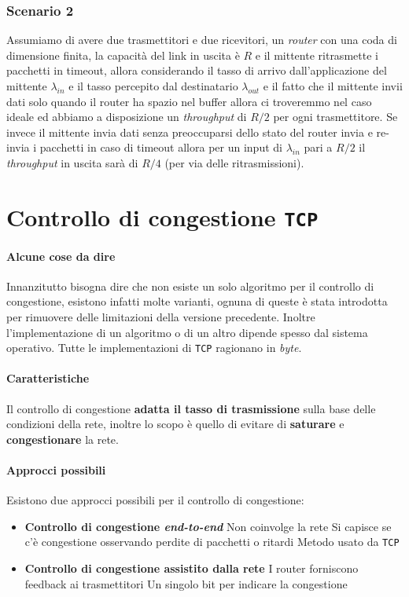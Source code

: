         \subsubsection{Scenario 2}
            Assumiamo di avere due trasmettitori e due ricevitori, un \textit{router} con una coda di dimensione finita, la capacità del link in uscita è $ R $ e il mittente ritrasmette i pacchetti in timeout, allora considerando il tasso di arrivo dall'applicazione del mittente $\lambda_{in}$ e il tasso percepito dal destinatario $\lambda_{out}$ e il fatto che il mittente invii dati solo quando il router ha spazio nel buffer allora ci troveremmo nel caso ideale ed abbiamo a disposizione un \textit{throughput} di $ R/2 $ per ogni trasmettitore. Se invece il mittente invia dati senza preoccuparsi dello stato del router invia e re-invia i pacchetti in caso di timeout allora per un input di $\lambda_{in}$ pari a $ R/2 $ il \textit{throughput} in uscita sarà di $ R/4 $ (per via delle ritrasmissioni).
\section{Controllo di congestione \texttt{TCP}}
    \paragraph{Alcune cose da dire} Innanzitutto bisogna dire che non esiste un solo algoritmo per il controllo di congestione, esistono infatti molte varianti, ognuna di queste è stata introdotta per rimuovere delle limitazioni della versione precedente. Inoltre l'implementazione di un algoritmo o di un altro dipende spesso dal sistema operativo. Tutte le implementazioni di \texttt{TCP} ragionano in \textit{byte}.
    \paragraph{Caratteristiche} Il controllo di congestione \textbf{adatta il tasso di trasmissione} sulla base delle condizioni della rete, inoltre lo scopo è quello di evitare di \textbf{saturare} e \textbf{congestionare} la rete. 
    \paragraph{Approcci possibili} Esistono due approcci possibili per il controllo di congestione: \begin{itemize}
        \item \textbf{Controllo di congestione \textit{end-to-end}} 
            \subitem Non coinvolge la rete
            \subitem Si capisce se c'è congestione osservando perdite di pacchetti o ritardi
            \subitem Metodo usato da \texttt{TCP}
        \item \textbf{Controllo di congestione assistito dalla rete}
            \subitem I router forniscono feedback ai trasmettitori
            \subitem Un singolo bit per indicare la congestione
    \end{itemize}
